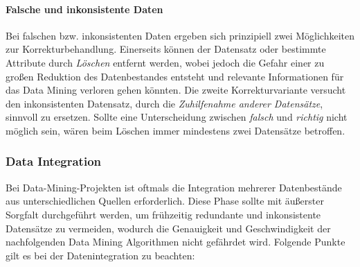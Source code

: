 \paragraph{Falsche und inkonsistente Daten}
Bei falschen bzw. inkonsistenten Daten ergeben sich prinzipiell zwei Möglichkeiten zur Korrekturbehandlung. Einerseits können der Datensatz oder bestimmte Attribute durch \textit{Löschen} entfernt werden, wobei jedoch die Gefahr einer zu großen Reduktion des Datenbestandes entsteht und relevante Informationen für das Data Mining verloren gehen könnten. Die zweite Korrekturvariante versucht den inkonsistenten Datensatz, durch die \textit{Zuhilfenahme anderer Datensätze}, sinnvoll zu ersetzen. Sollte eine Unterscheidung zwischen \textit{falsch} und \textit{richtig} nicht möglich sein, wären beim Löschen immer mindestens zwei Datensätze betroffen.

\subsubsection{Data Integration}
\label{di}
Bei Data-Mining-Projekten ist oftmals die Integration mehrerer Datenbestände aus unterschiedlichen Quellen erforderlich. Diese Phase sollte mit äußerster Sorgfalt durchgeführt werden, um frühzeitig redundante und inkonsistente Datensätze zu vermeiden, wodurch die Genauigkeit und Geschwindigkeit der nachfolgenden Data Mining Algorithmen nicht gefährdet wird. Folgende Punkte gilt es bei der Datenintegration zu beachten:

